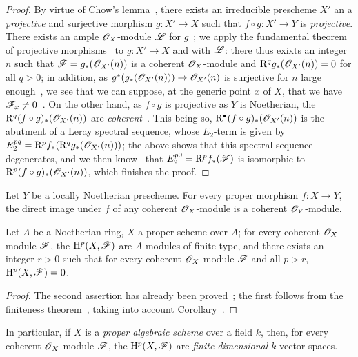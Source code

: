 \begin{proof}
By virtue of Chow's lemma~, there exists an irreducible prescheme $X'$ an a \emph{projective} and surjective morphism $g:X'\to X$ such that $f\circ g:X'\to Y$ is \emph{projective}.
There exists an ample $\mathscr{O}_X$-module $\mathscr{L}$ for $g$~; we apply the fundamental theorem of projective morphisms~ to $g:X'\to X$ and with $\mathscr{L}$: there thus exixts an integer $n$ such that $\mathscr{F}=g_*(\mathscr{O}_{X'}(n))$ is a coherent $\mathscr{O}_X$-module and $\mathrm{R}^q g_*(\mathscr{O}_{X'}(n))=0$ for all $q>0$; in addition, as $g^*(g_*(\sh{O}_{X'}(n)))\to\sh{O}_{X'}(n)$ is surjective for $n$ large enough~, we see that we can suppose, at the generic point $x$ of $X$, that we have $\mathscr{F}_x\neq 0$~.
On the other hand, as $f\circ g$ is projective as $Y$ is Noetherian, the $\mathrm{R}^q(f\circ g)_*(\mathscr{O}_{X'}(n))$ are \emph{coherent}~.
This being so, $\mathrm{R}^\bullet(f\circ g)_*(\mathscr{O}_{X'}(n))$ is the abutment of a Leray spectral sequence, whose $E_2$-term is given by $E_2^{pq}=\mathrm{R}^p f_*(\mathrm{R}^q g_*(\mathscr{O}_{X'}(n)))$; the above shows that this spectral sequence degenerates, and we then know~ that $E_2^{p0}=\mathrm{R}^p f_*(\mathscr{F})$ is isomorphic to $\mathrm{R}^p(f\circ g)_*(\mathscr{O}_{X'}(n))$, which finishes the proof.
\end{proof}

\begin{corollary}[3.2.2]
\label{3.3.2.2}
Let $Y$ be a locally Noetherian prescheme.
For every proper morphism $f:X\to Y$, the direct image under $f$ of any coherent $\mathscr{O}_X$-module is a coherent $\mathscr{O}_Y$-module.
\end{corollary}

\begin{corollary}[3.2.3]
\label{3.3.2.3}
Let $A$ be a Noetherian ring, $X$ a proper scheme over $A$; for every coherent $\mathscr{O}_X$-module $\mathscr{F}$, the $\mathrm{H}^p(X,\mathscr{F})$ are $A$-modules of finite type, and there exists an integer $r>0$ such that for every coherent $\mathscr{O}_X$-module $\mathscr{F}$ and all $p>r$, $\mathrm{H}^p(X,\mathscr{F})=0$.
\end{corollary}

\begin{proof}
\label{proof-3.3.2.3}
The second assertion has already been proved~; the first follows from the finiteness theorem~, taking into account Corollary~.
\end{proof}

In particular, if $X$ is a \emph{proper algebraic scheme} over a field $k$, then, for every coherent $\mathscr{O}_X$-module $\mathscr{F}$, the $\mathrm{H}^p(X,\mathscr{F})$ are \emph{finite-dimensional} $k$-vector spaces.

